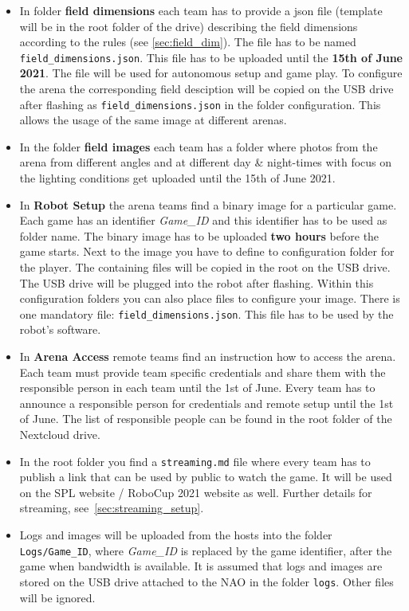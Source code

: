 \begin{itemize}
    \item In folder \textbf{field dimensions} each team has to provide a json file (template will be in the root folder of the drive) describing the field dimensions according to the rules (see \ref{sec:field_dim}). The file has to be named \texttt{field\_dimensions.json}. This file has to be uploaded until the \textbf{15th of June 2021}. The file will be used for autonomous setup and game play. To configure the arena the corresponding field desciption will be copied on the USB drive after flashing as \texttt{field\_dimensions.json} in the folder configuration. This allows the usage of the same image at different arenas.
    \item  In the folder \textbf{field images} each team has a folder where photos from the arena from different angles and at different day \& night-times with focus on the lighting conditions get uploaded until the 15th of June 2021.
    \item In \textbf{Robot Setup} the arena teams find a binary image for a particular game. Each game has an identifier \textit{Game\_ID} and this identifier has to be used as folder name. The binary image has to be uploaded \textbf{two hours} before the game starts. Next to the image you have to define to configuration folder for the player. The containing files will be copied in the root on the USB drive. The USB drive will be plugged into the robot after flashing. Within this configuration folders you can also place files to configure your image. There is one mandatory file: \texttt{field\_dimensions.json}. This file has to be used by the robot's software.
    \item In \textbf{Arena Access} remote teams find an instruction how to access the arena. Each team must provide team specific credentials and share them with the responsible person in each team until the 1st of June. Every team has to announce a responsible person for credentials and remote setup until the 1st of June. The list of responsible people can be found in the root folder of the Nextcloud drive.
    \item In the root folder you find a \texttt{streaming.md} file where every team has to publish a link that can be used by public to watch the game. It will be used on the SPL website / RoboCup 2021 website as well. Further details for streaming, see~\ref{sec:streaming_setup}.
	\item Logs and images will be uploaded from the hosts into the folder \texttt{Logs/Game\_ID}, where \textit{Game\_ID} is replaced by the game identifier, after the game when bandwidth is available. It is assumed that logs and images are stored on the USB drive attached to the NAO in the folder \texttt{logs}. Other files will be ignored. 

\end{itemize}

